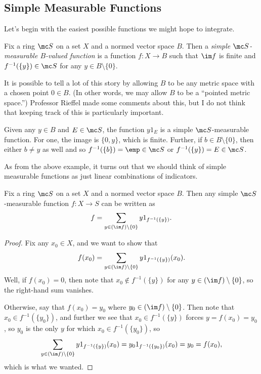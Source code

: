 \documentclass[../notes.tex]{subfiles}
\begin{document}
\subsection{Simple Measurable Functions}
Let's begin with the easiest possible functions we might hope to integrate.
\begin{definition}
	Fix a ring $\mc S$ on a set $X$ and a normed vector space $B$. Then a \textit{simple $\mc S$-measurable $B$-valued function} is a function $f\colon X\to B$ such that $\im f$ is finite and $f^{-1}(\{y\})\in\mc S$ for any $y\in B\setminus\{0\}$.
\end{definition}
\begin{remark}
	It is possible to tell a lot of this story by allowing $B$ to be any metric space with a chosen point $0\in B$. (In other words, we may allow $B$ to be a ``pointed metric space.'') Professor Rieffel made some comments about this, but I do not think that keeping track of this is particularly important.
\end{remark}
\begin{example} \label{ex:indicator-is-simple}
	Given any $y\in B$ and $E\in\mc S$, the function $y1_E$ is a simple $\mc S$-measurable function. For one, the image is $\{0,y\}$, which is finite. Further, if $b\in B\setminus\{0\}$, then either $b\ne y$ as well and so $f^{-1}(\{b\})=\emp\in\mc S$ or $f^{-1}(\{y\})=E\in\mc S$.
\end{example}
As from the above example, it turns out that we should think of simple measurable functions as just linear combinations of indicators.
\begin{lemma} \label{lem:simple-is-linear-combo-of-chars}
	Fix a ring $\mc S$ on a set $X$ and a normed vector space $B$. Then any simple $\mc S$-measurable function $f\colon X\to S$ can be written as
	\[f=\sum_{y\in(\im f)\setminus\{0\}}y1_{f^{-1}(\{y\})}.\]
\end{lemma}
\begin{proof}
	Fix any $x_0\in X$, and we want to show that
	\[f(x_0)=\sum_{y\in(\im f)\setminus\{0\}}y1_{f^{-1}(\{y\})}(x_0).\]
	Well, if $f(x_0)=0$, then note that $x_0\notin f^{-1}(\{y\})$ for any $y\in(\im f)\setminus\{0\}$, so the right-hand sum vanishes.
	
	Otherwise, say that $f(x_0)=y_0$ where $y_0\in(\im f)\setminus\{0\}$. Then note that $x_0\in f^{-1}(\{y_0\})$, and further we see that $x_0\in f^{-1}(\{y\})$ forces $y=f(x_0)=y_0$, so $y_0$ is the only $y$ for which $x_0\in f^{-1}(\{y_0\})$, so
	\[\sum_{y\in(\im f)\setminus\{0\}}y1_{f^{-1}(\{y\})}(x_0)=y_01_{f^{-1}(\{y_0\})}(x_0)=y_0=f(x_0),\]
	which is what we wanted.
\end{proof}
\end{document}
